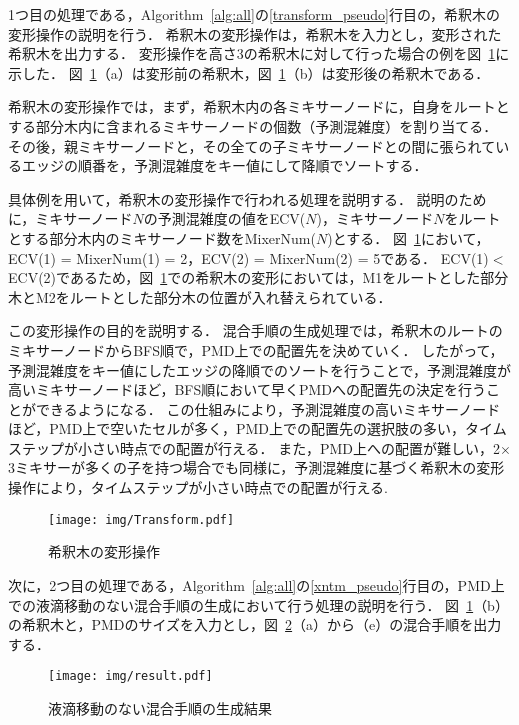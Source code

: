1つ目の処理である，Algorithm~\ref{alg:all}の\ref{transform_pseudo}行目の，希釈木の変形操作の説明を行う． 希釈木の変形操作は，希釈木を入力とし，変形された希釈木を出力する． 変形操作を高さ3の希釈木に対して行った場合の例を図~\ref{fig:Transform}に示した．
図~\ref{fig:Transform}（a）は変形前の希釈木，図~\ref{fig:Transform}（b）は変形後の希釈木である．

希釈木の変形操作では，まず，希釈木内の各ミキサーノードに，自身をルートとする部分木内に含まれるミキサーノードの個数（予測混雑度）を割り当てる．
その後，親ミキサーノードと，その全ての子ミキサーノードとの間に張られているエッジの順番を，予測混雑度をキー値にして降順でソートする． 

具体例を用いて，希釈木の変形操作で行われる処理を説明する．
説明のために，ミキサーノード$N$の予測混雑度の値をECV($N$)，ミキサーノード$N$をルートとする部分木内のミキサーノード数をMixerNum($\mathit{N}$)とする．
図~\ref{fig:Transform}において，ECV(1) = MixerNum(1) = 2，ECV(2) = MixerNum(2) = 5である．
ECV(1)$<$ECV(2)であるため，図~\ref{fig:Transform}での希釈木の変形においては，M1をルートとした部分木とM2をルートとした部分木の位置が入れ替えられている．

この変形操作の目的を説明する．
混合手順の生成処理では，希釈木のルートのミキサーノードからBFS順で，PMD上での配置先を決めていく．
したがって，予測混雑度をキー値にしたエッジの降順でのソートを行うことで，予測混雑度が高いミキサーノードほど，BFS順において早くPMDへの配置先の決定を行うことができるようになる．
この仕組みにより，予測混雑度の高いミキサーノードほど，PMD上で空いたセルが多く，PMD上での配置先の選択肢の多い，タイムステップが小さい時点での配置が行える．
また，PMD上への配置が難しい，2$\times$3ミキサーが多くの子を持つ場合でも同様に，予測混雑度に基づく希釈木の変形操作により，タイムステップが小さい時点での配置が行える.　

\begin{figure}[tbp]
 \centering\texttt{[image: img/Transform.pdf]}
 \caption{希釈木の変形操作}\label{fig:Transform}
\end{figure}


次に，2つ目の処理である，Algorithm~\ref{alg:all}の\ref{xntm_pseudo}行目の，PMD上での液滴移動のない混合手順の生成において行う処理の説明を行う．
図~\ref{fig:Transform}（b）の希釈木と，PMDのサイズを入力とし，図~\ref{fig:result}（a）から（e）の混合手順を出力する．
\begin{figure}[tbp]
 \centering\texttt{[image: img/result.pdf]}
 \caption{液滴移動のない混合手順の生成結果}\label{fig:result}
\end{figure}

